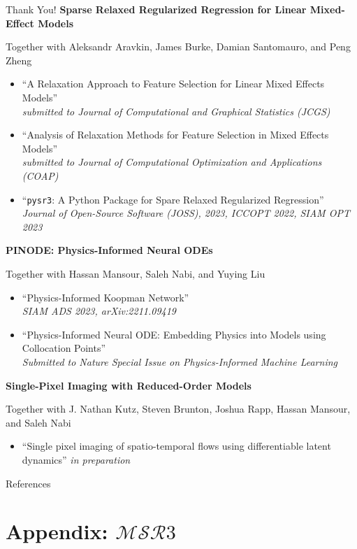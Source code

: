 \documentclass[8pt]{beamer}
\begin{document}
\begin{frame}{Thank You!}
\vspace{1em}
\textbf{Sparse Relaxed Regularized Regression for Linear Mixed-Effect Models}\\
{\small
Together with Aleksandr Aravkin, James Burke, Damian Santomauro, and Peng Zheng
\begin{itemize}
	\item ``A Relaxation Approach to Feature Selection for Linear Mixed Effects Models''\\ \textit{submitted to Journal of Computational and Graphical Statistics (JCGS)}
	\item ``Analysis of Relaxation Methods for Feature Selection in Mixed Effects Models'' \\ \textit{submitted to Journal of Computational Optimization and Applications (COAP)}
	\item ``\texttt{pysr3}: A Python Package for Spare Relaxed Regularized Regression'' \\ \textit{Journal of Open-Source Software (JOSS), 2023, ICCOPT 2022, SIAM OPT 2023}
\end{itemize}
}

\vspace{1em}
\textbf{PINODE: Physics-Informed Neural ODEs}\\
{\small
Together with Hassan Mansour, Saleh Nabi, and Yuying Liu
\begin{itemize}
	\item ``Physics-Informed Koopman Network'' \\
	\textit{SIAM ADS 2023, arXiv:2211.09419}
	\item ``Physics-Informed Neural ODE: Embedding Physics into Models using Collocation Points''\\
	\textit{Submitted to Nature Special Issue on Physics-Informed Machine Learning}
\end{itemize}
}

\vspace{1em}
\textbf{Single-Pixel Imaging with Reduced-Order Models}\\
{\small
Together with J. Nathan Kutz, Steven Brunton, Joshua Rapp, Hassan Mansour, and Saleh Nabi
\begin{itemize}
	\item ``Single pixel imaging of spatio-temporal flows using differentiable latent dynamics'' \textit{in preparation}
\end{itemize}
}
\end{frame}

\begin{frame}{References}
    \printbibliography[heading=none]
\end{frame}

\appendix
\section{Appendix: \texorpdfstring{$\mathcal{MSR}3$}{MSR3}}
\end{document}
